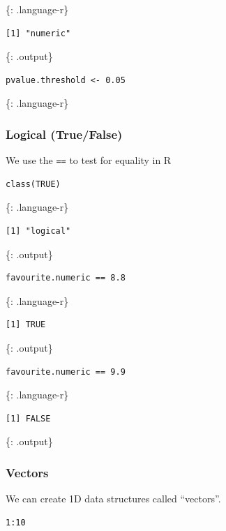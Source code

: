 \documentclass[]{article}
\begin{document}
\{: .language-r\}

\begin{verbatim}
[1] "numeric"
\end{verbatim}

\{: .output\}

\begin{verbatim}
pvalue.threshold <- 0.05
\end{verbatim}

\{: .language-r\}

\subsubsection{Logical (True/False)}\label{logical-truefalse}

We use the \texttt{==} to test for equality in R

\begin{verbatim}
class(TRUE)
\end{verbatim}

\{: .language-r\}

\begin{verbatim}
[1] "logical"
\end{verbatim}

\{: .output\}

\begin{verbatim}
favourite.numeric == 8.8
\end{verbatim}

\{: .language-r\}

\begin{verbatim}
[1] TRUE
\end{verbatim}

\{: .output\}

\begin{verbatim}
favourite.numeric == 9.9
\end{verbatim}

\{: .language-r\}

\begin{verbatim}
[1] FALSE
\end{verbatim}

\{: .output\}

\subsubsection{Vectors}\label{vectors}

We can create 1D data structures called ``vectors''.

\begin{verbatim}
1:10
\end{verbatim}
\end{document}
